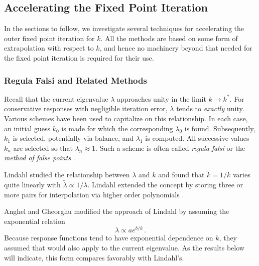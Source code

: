 \subsection{Accelerating the Fixed Point Iteration}

In the sections to follow, we investigate several techniques for 
accelerating the outer fixed point iteration for $k$.  All 
the methods are based on some form of extrapolation with respect to 
$k$, and hence no machinery beyond that needed for the 
fixed point iteration is required for their use.

\subsubsection{Regula Falsi and Related Methods}
\label{sec:extrapolationmethods}


Recall that the current eigenvalue $\lambda$ approaches unity in the 
limit $k\to k^*$.  For conservative responses with negligible 
iteration error, $\lambda$ tends to {\it exactly} unity.  Various 
schemes have been used to capitalize on this relationship.  In each 
case, an initial guess $k_0$ is made for which the corresponding 
$\lambda_0$ is found.  Subsequently, $k_1$ is selected, potentially via 
balance, and $\lambda_1$ is computed.  All successive values $k_n$  
are selected so that $\lambda_n \approx 1$.  Such a scheme is often
called {\it regula falsi} or the {\it method of false points} 
\cite{lindahl1976mdr}.

Lindahl studied the relationship between $\lambda$ and $k$ and found that 
$\tilde{k} = 1/k$ varies quite 
linearly with $\tilde{\lambda} \propto 1/\lambda$.
Lindahl extended the concept by storing three or more pairs for interpolation
via higher order polynomials \cite{lindahl1976mdr}.

Anghel and Gheorghu \cite{anghel1987isr}
modified the approach of Lindahl by assuming the 
exponential relation
\begin{equation}
  \lambda \propto a e^{b/k} \, .
\end{equation}
Because response functions tend to have exponential dependence on 
$k$, they assumed that would also apply to the current eigenvalue.  As the
results below will indicate, this form compares favorably with Lindahl's.

